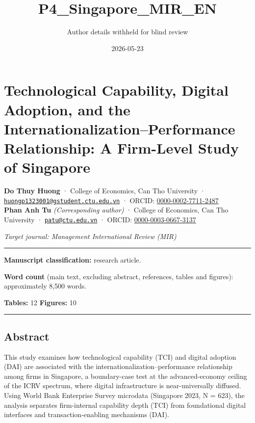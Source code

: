 \documentclass[12pt,a4paper]{article}
\title{P4\_Singapore\_MIR\_EN}
\author{Author details withheld for blind review}
\date{2026-05-23}
\begin{document}
\maketitle

\hypertarget{technological-capability-digital-adoption-and-the-internationalizationperformance-relationship-a-firm-level-study-of-singapore}{%
\section{Technological Capability, Digital Adoption, and the
Internationalization--Performance Relationship: A Firm-Level Study of
Singapore}\label{technological-capability-digital-adoption-and-the-internationalizationperformance-relationship-a-firm-level-study-of-singapore}}

\textbf{Do Thuy Huong} · College of Economics, Can Tho University ·
\href{mailto:huongp1323001@gstudent.ctu.edu.vn}{\nolinkurl{huongp1323001@gstudent.ctu.edu.vn}}
· ORCID:
\href{https://orcid.org/0000-0002-7711-2487}{0000-0002-7711-2487}\\
\textbf{Phan Anh Tu} \emph{(Corresponding author)} · College of
Economics, Can Tho University ·
\href{mailto:patu@ctu.edu.vn}{\nolinkurl{patu@ctu.edu.vn}} · ORCID:
\href{https://orcid.org/0000-0003-0667-3137}{0000-0003-0667-3137}

\emph{Target journal: Management International Review (MIR)}

\begin{center}\rule{0.5\linewidth}{0.5pt}\end{center}

\textbf{Manuscript classification:} research article.

\textbf{Word count} (main text, excluding abstract, references, tables
and figures): approximately 8,500 words.

\textbf{Tables:} 12 \textbar{} \textbf{Figures:} 10

\begin{center}\rule{0.5\linewidth}{0.5pt}\end{center}

\hypertarget{abstract}{%
\subsection{Abstract}\label{abstract}}

This study examines how technological capability (TCI) and digital
adoption (DAI) are associated with the internationalization--performance
relationship among firms in Singapore, a boundary-case test at the
advanced-economy ceiling of the ICRV spectrum, where digital
infrastructure is near-universally diffused. Using World Bank Enterprise
Survey microdata (Singapore 2023, N = 623), the analysis separates
firm-internal capability depth (TCI) from foundational digital
interfaces and transaction-enabling mechanisms (DAI).
\end{document}
